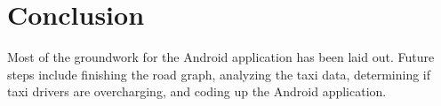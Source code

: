 \documentclass{sig-alternate}
\begin{document}
\section{Conclusion}
Most of the groundwork for the Android application has been laid out. Future steps include finishing the road graph, analyzing the taxi data, determining if taxi drivers are overcharging, and coding up the Android application.



%
%
\end{document}
